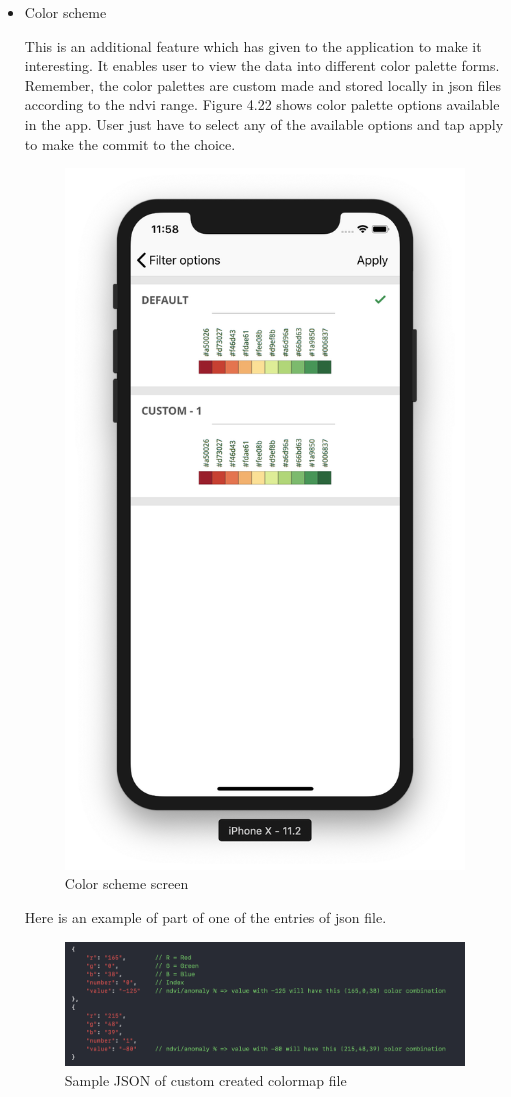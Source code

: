 \begin{itemize}
    \item Color scheme
    
    
    This is an additional feature which has given to the application to make it interesting. It enables user to view the data into different color palette forms. Remember, the color palettes are custom made and stored locally in \gls{json} files according to the \gls{ndvi} range. Figure 4.22 shows color palette options available in the app. User just have to select any of the available options and tap apply to make the commit to the choice.
    
     \begin{figure}[H]
            \centering
            \includegraphics[width=0.25\linewidth]{figures/ch4/color_scheme.png}
            \caption{\label{fig:color_scheme_screen} Color scheme screen}
    \end{figure}
        
    Here is an example of part of one of the entries of \gls{json} file.
    
    \begin{figure}[H]
            \centering
            \includegraphics[width=1.0\linewidth]{figures/ch4/color_map_final.png}
            \caption{\label{fig:color_json} Sample JSON of custom created colormap file}
    \end{figure}

\end{itemize}



